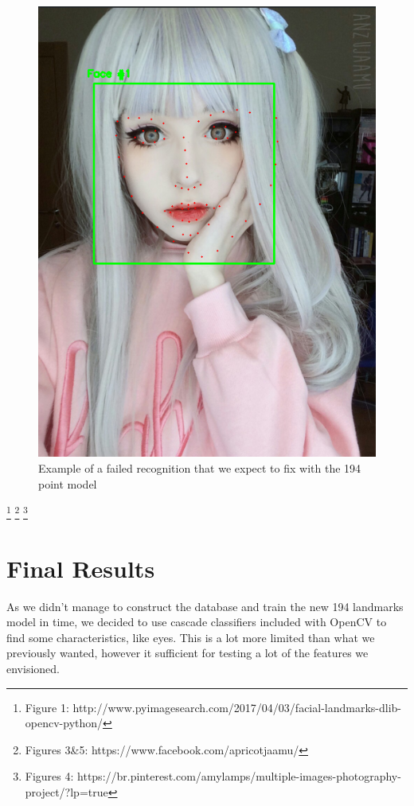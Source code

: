 \documentclass[12pt,a4paper]{article}
\begin{document}
    \begin{figure}[!ht]
        \centering
        \includegraphics[scale=0.5]{AnzuscWrong.png}
        \caption{Example of a failed recognition that we expect to fix with the 194 point model}
        \label{Anzu2}
    \end{figure}
    
    \footnote{Figure 1: http://www.pyimagesearch.com/2017/04/03/facial-landmarks-dlib-opencv-python/}
    \footnote{Figures 3\&5: https://www.facebook.com/apricotjaamu/}
    \footnote{Figures 4: https://br.pinterest.com/amylamps/multiple-images-photography-project/?lp=true}
    
\newpage

\section{Final Results}
    As we didn't manage to construct the database and train the new 194 landmarks model in time, we decided to use cascade classifiers included with OpenCV to find some characteristics, like eyes. This is a lot more limited than what we previously wanted, however it sufficient for testing a lot of the features we envisioned.
\end{document}
